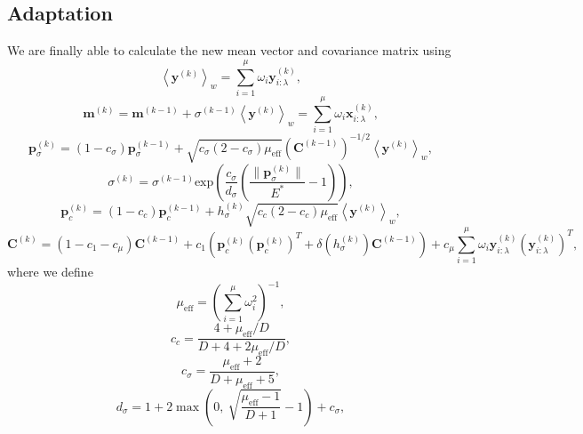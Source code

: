 \subsection{Adaptation}
We are finally able to calculate the new mean vector and covariance matrix using
\begin{equation}
\left\langle\mathbf{y}^{(k)}\right\rangle_w=\sum_{i=1}^\mu\omega_i\mathbf{y}^{(k)}_{i:\lambda},
\end{equation}
\begin{equation}\label{mean}
\mathbf{m}^{(k)}=\mathbf{m}^{(k-1)}+\sigma^{(k-1)}\left\langle\mathbf{y}^{(k)}\right\rangle_w=\sum_{i=1}^\mu\omega_i\mathbf{x}^{(k)}_{i:\lambda},
\end{equation}
\begin{equation}
\mathbf{p}^{(k)}_\sigma=(1-c_\sigma)\mathbf{p}^{(k-1)}_\sigma+\sqrt{c_\sigma(2-c_\sigma)\mu_{\mathrm{eff}}}\left(\mathbf{C}^{(k-1)}\right)^{-1/2}\left\langle\mathbf{y}^{(k)}\right\rangle_w,
\end{equation}
\begin{equation}
\sigma^{(k)}=\sigma^{(k-1)}\mathrm{exp}\left(\frac{c_\sigma}{d_\sigma}\left(\frac{\|\mathbf{p}^{(k)}_\sigma\|}{E^*}-1\right)\right),
\end{equation}
\begin{equation}
\mathbf{p}^{(k)}_c=(1-c_c)\mathbf{p}^{(k-1)}_c+h_\sigma^{(k)}\sqrt{c_c(2-c_c)\mu_{\mathrm{eff}}}\left\langle\mathbf{y}^{(k)}\right\rangle_w,
\end{equation}
\begin{equation}\label{covariance}
\mathbf{C}^{(k)}=\left(1-c_1-c_\mu\right)\mathbf{C}^{(k-1)}+c_1\left(\mathbf{p}_c^{(k)}\left(\mathbf{p}_c^{(k)}\right)^T+\delta\left(h_\sigma^{(k)}\right)\mathbf{C}^{(k-1)}\right)+c_\mu\sum_{i=1}^\mu\omega_i\mathbf{y}^{(k)}_{i:\lambda}\left(\mathbf{y}^{(k)}_{i:\lambda}\right)^T,
\end{equation}
\noindent where we define
\begin{equation}
\mu_{\mathrm{eff}}=\left(\sum_{i=1}^\mu\omega_i^2\right)^{-1},
\end{equation}
\begin{equation}
c_c=\frac{4+\mu_{\mathrm{eff}}/D}{D+4+2\mu_{\mathrm{eff}}/D},
\end{equation}
\begin{equation}
c_\sigma=\frac{\mu_{\mathrm{eff}}+2}{D+\mu_{\mathrm{eff}}+5},
\end{equation}
\begin{equation}
d_\sigma=1+2\max\left(0,\ \sqrt{\frac{\mu_{\mathrm{eff}}-1}{D+1}}-1\right)+c_\sigma,
\end{equation}
